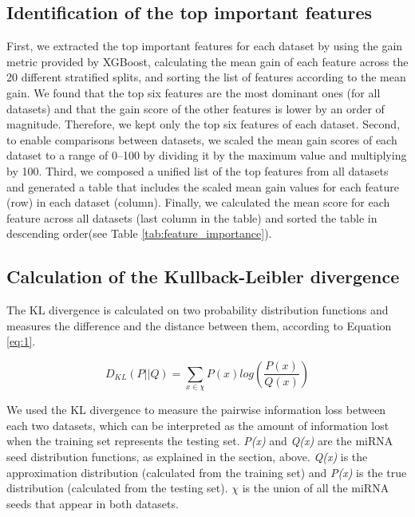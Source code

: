 \documentclass{bmcart}
\begin{document}
\subsection*{Identification of the top important features} \label{ident_top_features}
First, we extracted the top important features for each dataset by using the gain metric provided by XGBoost, calculating the mean gain of each feature across the 20 different stratified splits, and sorting the list of features according to the mean gain. We found that the top six features are the most dominant ones (for all datasets) and that the gain score of the other features is lower by an order of magnitude. Therefore, we kept only the top six features of each dataset.  
Second, to enable comparisons between datasets, we scaled the mean gain scores of each dataset to a range of 0--100 by dividing it by the maximum value and multiplying by 100. 
Third, we composed a unified list of the top features from all datasets and generated a table that includes the scaled mean gain values for each feature (row) in each dataset (column). Finally, we calculated the mean score for each feature across all datasets (last column in the table) and sorted the table in descending order(see Table \ref{tab:feature_importance}).

\subsection*{Calculation of the Kullback-Leibler divergence}
The KL divergence is calculated on two probability distribution functions and measures the difference and the distance between them, according to Equation \ref{eq:1}.

\begin{equation}
 D_{KL} \left (P ||Q \right ) = \sum_{x\in \chi }{P\left ( x \right )log\left ( \frac{P\left ( x \right )}{Q\left ( x \right )} \right )}\label{eq:1}
\end{equation}

We used the KL divergence to measure the pairwise information loss between each two datasets, which can be interpreted as the amount of information lost when the training set represents the testing set. \textit{P(x)} and \textit{Q(x)} are the miRNA seed distribution functions, as explained in the  section, above. \textit{Q(x)} is the approximation distribution (calculated from the training set) and \textit{P(x)} is the true distribution (calculated from the testing set). $\chi$ is the union of all the miRNA seeds that appear in both datasets.
\end{document}
